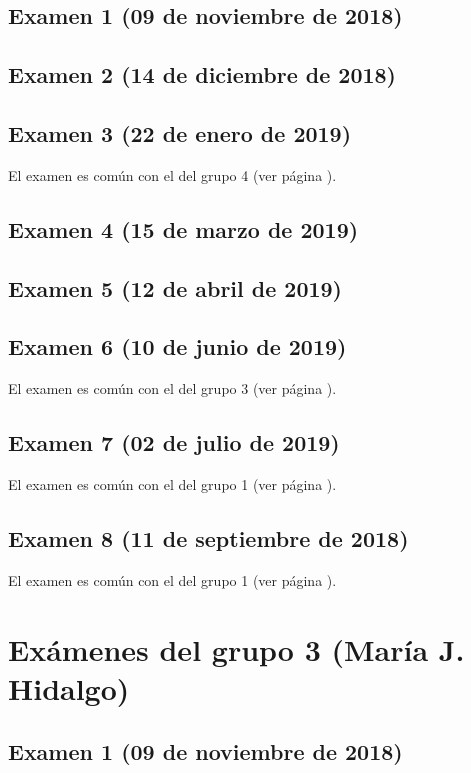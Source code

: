 \documentclass[a4paper,12pt,twoside]{book}
\begin{document}
\subsection{Examen 1 (09 de noviembre de 2018)}
\subsection{Examen 2 (14 de diciembre de 2018)}
\subsection{Examen 3 (22 de enero de 2019)}
El examen es común con el del grupo 4 (ver página \pageref{examen_18_19_4_3}).
\subsection{Examen 4 (15 de marzo de 2019)}
\subsection{Examen 5 (12 de abril de 2019)}
\subsection{Examen 6 (10 de junio de 2019)}
El examen es común con el del grupo 3 (ver página \pageref{examen_18_19_3_6}).
\subsection{Examen 7 (02 de julio de 2019)}
El examen es común con el del grupo 1 (ver página \pageref{examen_18_19_1_7}).
\subsection{Examen 8 (11 de septiembre de 2018)}
El examen es común con el del grupo 1 (ver página \pageref{examen_18_19_1_8}).

\section{Exámenes del grupo 3 (María J. Hidalgo)}
\subsection{Examen 1 (09 de noviembre de 2018)}
\end{document}
